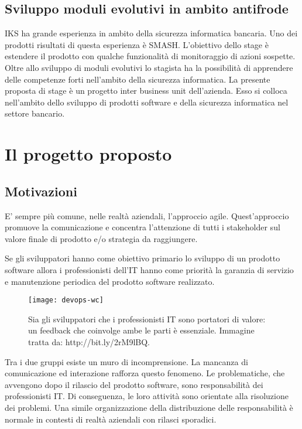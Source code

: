 \subsection{Sviluppo moduli evolutivi in ambito antifrode}
IKS ha grande esperienza in ambito della sicurezza informatica bancaria. Uno 
dei prodotti risultati di questa esperienza è SMASH. L'obiettivo dello stage è 
estendere il prodotto con qualche funzionalità di monitoraggio di azioni 
sospette. Oltre allo sviluppo di moduli evolutivi lo stagista ha la possibilità 
di apprendere delle competenze forti nell'ambito della 
sicurezza informatica. 
La presente proposta di stage è un progetto inter business unit dell'azienda. 
Esso si colloca nell'ambito dello sviluppo di prodotti software e della 
sicurezza informatica nel settore bancario.


\section{Il progetto proposto}
\subsection{Motivazioni}

E' sempre più comune, nelle realtà aziendali, l'approccio agile. 
Quest'approccio 
promuove la comunicazione e concentra l'attenzione di tutti i stakeholder sul 
valore 
finale di prodotto e/o strategia da raggiungere. 

Se gli sviluppatori hanno come obiettivo primario lo sviluppo di un prodotto 
software 
allora i professionisti dell'IT hanno come priorità la garanzia di servizio e 
manutenzione 
periodica del prodotto software realizzato. 

\begin{figure}[htbp]
	\begin{center}
		\texttt{[image: devops-wc]}
		\caption{Sia gli sviluppatori che i professionisti IT sono 
portatori di valore: 
	    un feedback che coinvolge ambe le parti è essenziale. Immagine 
tratta 
		da: http://bit.ly/2rM9lBQ.}
	\end{center}
\end{figure}


Tra i due gruppi esiste un muro di incomprensione. La mancanza di comunicazione 
ed 
interazione rafforza questo fenomeno. Le problematiche, che avvengono dopo il 
rilascio del prodotto 
software, sono responsabilità dei professionisti IT. Di conseguenza, le loro 
attività 
sono orientate alla risoluzione dei problemi. Una simile organizzazione della 
distribuzione 
delle responsabilità è normale in contesti di realtà aziendali con rilasci 
sporadici.  

